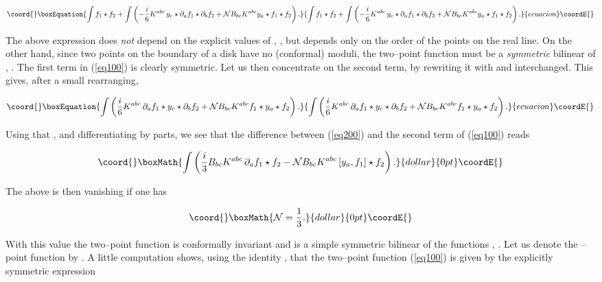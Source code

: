 \documentclass[a4paper,11pt]{article}
\begin{document}
\begin{equation}\coord{}\boxEquation{
\int f_{1}\star f_{2}+\int \left( -\frac{i}{6}K^{abc}{}\,y_{c}\star \partial
_{a}f_{1}\star \partial _{b}f_{2}+\mathcal{N}B_{bc}K^{abc}y_{a}\star
f_{1}\star f_{2}\right) .  \label{eq100}
}{
\int f_{1}\star f_{2}+\int \left( -\frac{i}{6}K^{abc}{}\,y_{c}\star \partial
_{a}f_{1}\star \partial _{b}f_{2}+\mathcal{N}B_{bc}K^{abc}y_{a}\star
f_{1}\star f_{2}\right) .  }{ecuacion}\coordE{}\end{equation}

\noindent
The above expression does \textit{not} depend on the explicit values of 
\coordHE{}, \coordHE{}, but depends only on the order of the points 
\coordHE{} on the real line. On the other hand, since two points on the 
boundary of a disk have no (conformal) moduli, the two--point function must 
be a \textit{symmetric} bilinear of \coordHE{}, \coordHE{}. The first term in 
(\ref{eq100}) is clearly symmetric. Let us then concentrate on the second 
term, by rewriting it with \coordHE{} and \coordHE{} interchanged. This gives, 
after a small rearranging,

\begin{equation}\coord{}\boxEquation{
\int \left( \frac{i}{6}K^{abc}{}\,\partial _{a}f_{1}\star y_{c}\star
\partial _{b}f_{2}+\mathcal{N}B_{bc}K^{abc}f_{1}\star y_{a}\star
f_{2}\right) .  \label{eq200}
}{
\int \left( \frac{i}{6}K^{abc}{}\,\partial _{a}f_{1}\star y_{c}\star
\partial _{b}f_{2}+\mathcal{N}B_{bc}K^{abc}f_{1}\star y_{a}\star
f_{2}\right) .  }{ecuacion}\coordE{}\end{equation}

\noindent
Using that \coordHE{}, and differentiating by parts, we see that the
difference between (\ref{eq200}) and the second term of (\ref{eq100}) 
reads 

$$\coord{}\boxMath{
\int \left( \frac{i}{3}B_{bc}K^{abc}{}\,\partial _{a}f_{1}\star f_{2} 
- \mathcal{N}B_{bc}K^{abc}\left[ y_{a},f_{1}\right] \star f_{2}\right) .
}{dollar}{0pt}\coordE{}$$

\noindent
The above is then vanishing if one has

$$\coord{}\boxMath{
\mathcal{N}=\frac{1}{3}.
}{dollar}{0pt}\coordE{}$$

\noindent
With this value the two--point function is conformally invariant and is a
simple symmetric bilinear of the functions \coordHE{}, \coordHE{}. Let us denote 
the \coordHE{}--point function by \coordHE{}. A little computation shows, using the
identity \coordHE{}, that the two--point function (\ref{eq100})
is given by the explicitly symmetric expression 
\end{document}
